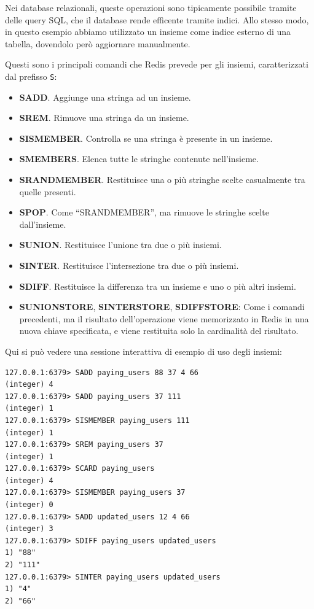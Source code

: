 Nei database relazionali, queste operazioni sono tipicamente possibile tramite delle query SQL, che
il database rende efficente tramite indici. Allo stesso modo, in questo esempio abbiamo utilizzato
un insieme come indice esterno di una tabella, dovendolo però aggiornare manualmente.

Questi sono i principali comandi che Redis prevede per gli insiemi, caratterizzati dal prefisso
\verb|S|:

\begin{itemize}
	\medskip
	\item \textbf{SADD}. Aggiunge una stringa ad un insieme.
	\item \textbf{SREM}. Rimuove una stringa da un insieme.
	\item \textbf{SISMEMBER}. Controlla se una stringa è presente in un insieme.
	\item \textbf{SMEMBERS}. Elenca tutte le stringhe contenute nell'insieme.
	\item \textbf{SRANDMEMBER}. Restituisce una o più stringhe scelte casualmente tra quelle
	presenti.
	\item \textbf{SPOP}. Come ``SRANDMEMBER'', ma rimuove le stringhe scelte dall'insieme.
	\item \textbf{SUNION}. Restituisce l'unione tra due o più insiemi.
	\item \textbf{SINTER}. Restituisce l'intersezione tra due o più insiemi.
	\item \textbf{SDIFF}. Restituisce la differenza tra un insieme e uno o più altri insiemi.
	\item \textbf{SUNIONSTORE}, \textbf{SINTERSTORE}, \textbf{SDIFFSTORE}: Come i comandi
	precedenti, ma il risultato dell'operazione viene memorizzato in Redis in una nuova chiave
	specificata, e viene restituita solo la cardinalità del risultato.
\end{itemize}

Qui si può vedere una sessione interattiva di esempio di uso degli insiemi:

\medskip
\begin{lstlisting}
127.0.0.1:6379> SADD paying_users 88 37 4 66
(integer) 4
127.0.0.1:6379> SADD paying_users 37 111
(integer) 1
127.0.0.1:6379> SISMEMBER paying_users 111
(integer) 1
127.0.0.1:6379> SREM paying_users 37
(integer) 1
127.0.0.1:6379> SCARD paying_users
(integer) 4
127.0.0.1:6379> SISMEMBER paying_users 37
(integer) 0
127.0.0.1:6379> SADD updated_users 12 4 66
(integer) 3
127.0.0.1:6379> SDIFF paying_users updated_users
1) "88"
2) "111"
127.0.0.1:6379> SINTER paying_users updated_users
1) "4"
2) "66"
\end{lstlisting}

